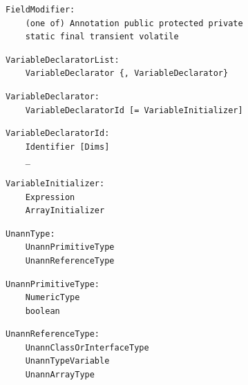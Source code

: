 \noindent\textbf{\texttt{}}\par
\begin{lstlisting}
FieldModifier:
    (one of) Annotation public protected private
    static final transient volatile
\end{lstlisting}

\noindent\textbf{\texttt{}}\par
\begin{lstlisting}
VariableDeclaratorList:
    VariableDeclarator {, VariableDeclarator}
\end{lstlisting}

\noindent\textbf{\texttt{}}\par
\begin{lstlisting}
VariableDeclarator:
    VariableDeclaratorId [= VariableInitializer]
\end{lstlisting}

\noindent\textbf{\texttt{}}\par
\begin{lstlisting}
VariableDeclaratorId:
    Identifier [Dims]
    _
\end{lstlisting}

\noindent\textbf{\texttt{}}\par
\begin{lstlisting}
VariableInitializer:
    Expression
    ArrayInitializer
\end{lstlisting}

\noindent\textbf{\texttt{}}\par
\begin{lstlisting}
UnannType:
    UnannPrimitiveType
    UnannReferenceType
\end{lstlisting}

\noindent\textbf{\texttt{}}\par
\begin{lstlisting}
UnannPrimitiveType:
    NumericType
    boolean
\end{lstlisting}

\noindent\textbf{\texttt{}}\par
\begin{lstlisting}
UnannReferenceType:
    UnannClassOrInterfaceType
    UnannTypeVariable
    UnannArrayType
\end{lstlisting}

